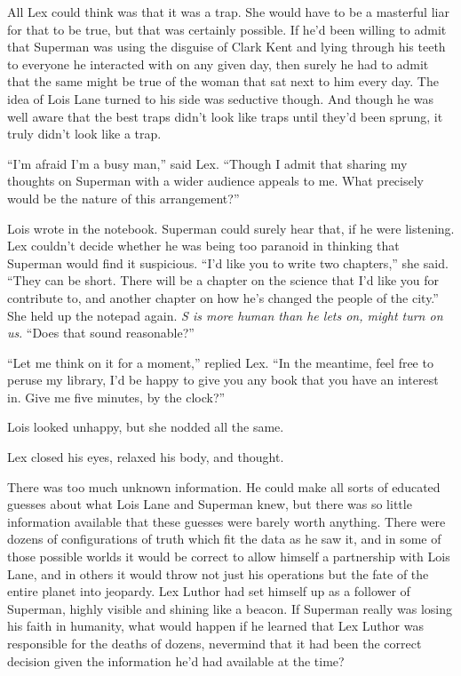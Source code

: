 \documentclass[ebook,12pt]{memoir}
\begin{document}
All Lex could think was that it was a trap. She would have to be a
masterful liar for that to be true, but that was certainly possible. If
he'd been willing to admit that Superman was using the disguise of Clark
Kent and lying through his teeth to everyone he interacted with on any
given day, then surely he had to admit that the same might be true of
the woman that sat next to him every day. The idea of Lois Lane turned
to his side was seductive though. And though he was well aware that the
best traps didn't look like traps until they'd been sprung, it truly
didn't look like a trap.

``I'm afraid I'm a busy man,'' said Lex. ``Though I admit that sharing
my thoughts on Superman with a wider audience appeals to me. What
precisely would be the nature of this arrangement?''

Lois wrote in the notebook. Superman could surely hear that, if he were
listening. Lex couldn't decide whether he was being too paranoid in
thinking that Superman would find it suspicious. ``I'd like you to write
two chapters,'' she said. ``They can be short. There will be a chapter
on the science that I'd like you for contribute to, and another chapter
on how he's changed the people of the city.'' She held up the notepad
again. \emph{S is more human than he lets on, might turn on us}. ``Does
that sound reasonable?''

``Let me think on it for a moment,'' replied Lex. ``In the meantime,
feel free to peruse my library, I'd be happy to give you any book that
you have an interest in. Give me five minutes, by the clock?''

Lois looked unhappy, but she nodded all the same.

Lex closed his eyes, relaxed his body, and thought.

There was too much unknown information. He could make all sorts of
educated guesses about what Lois Lane and Superman knew, but there was
so little information available that these guesses were barely worth
anything. There were dozens of configurations of truth which fit the
data as he saw it, and in some of those possible worlds it would be
correct to allow himself a partnership with Lois Lane, and in others it
would throw not just his operations but the fate of the entire planet
into jeopardy. Lex Luthor had set himself up as a follower of Superman,
highly visible and shining like a beacon. If Superman really was losing
his faith in humanity, what would happen if he learned that Lex Luthor
was responsible for the deaths of dozens, nevermind that it had been the
correct decision given the information he'd had available at the time?
\end{document}
